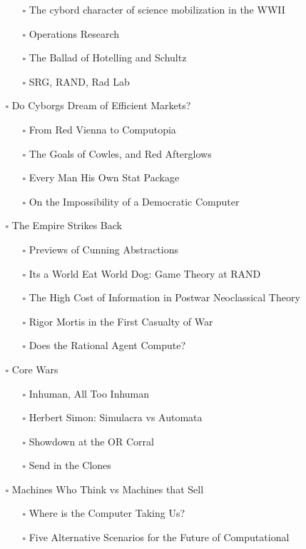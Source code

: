 \documentclass[paper=B6,portrait,twoside=true,twocolumn=false,headinclude=true,footinclude=false,fontsize=12,BCOR=10mm,DIV=calc,pagesize=auto,titlepage=firstiscover,mpinclude=false,headings=normal,headings=twolinechapter,open=right,toc=graduated,chapterprefix=false,numbers=endperiod,parskip=half+]{scrbook}
\theoremstyle{definition}
\begin{document}
\begin{enumerate}
\begin{itemize}
\begin{itemize}
\item[{$\square$}] The cybord character of science mobilization in the WWII
\item[{$\square$}] Operations Research
\item[{$\square$}] The Ballad of Hotelling and Schultz
\item[{$\square$}] SRG, RAND, Rad Lab
\end{itemize}
\item[{$\square$}] Do Cyborgs Dream of Efficient Markets?
\begin{itemize}
\item[{$\square$}] From Red Vienna to Computopia
\item[{$\square$}] The Goals of Cowles, and Red Afterglows
\item[{$\square$}] Every Man His Own Stat Package
\item[{$\square$}] On the Impossibility of a Democratic Computer
\end{itemize}
\item[{$\square$}] The Empire Strikes Back
\begin{itemize}
\item[{$\square$}] Previews of Cunning Abstractions
\item[{$\square$}] Its a World Eat World Dog: Game Theory at RAND
\item[{$\square$}] The High Cost of Information in Postwar Neoclassical Theory
\item[{$\square$}] Rigor Mortis in the First Casualty of War
\item[{$\square$}] Does the Rational Agent Compute?
\end{itemize}
\item[{$\square$}] Core Wars
\begin{itemize}
\item[{$\square$}] Inhuman, All Too Inhuman
\item[{$\square$}] Herbert Simon: Simulacra vs Automata
\item[{$\square$}] Showdown at the OR Corral
\item[{$\square$}] Send in the Clones
\end{itemize}
\item[{$\square$}] Machines Who Think vs Machines that Sell
\begin{itemize}
\item[{$\square$}] Where is the Computer Taking Us?
\item[{$\square$}] Five Alternative Scenarios for the Future of Computational

\end{itemize}
\end{itemize}
\end{enumerate}
\end{document}
